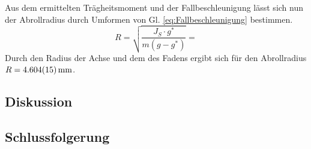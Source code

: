 			Aus dem ermittelten Trägheitsmoment und der Fallbeschleunigung lässt sich nun der Abrollradius durch Umformen von Gl. \ref{eq:Fallbeschleunigung} bestimmen.
			\begin{equation}
				R = \sqrt{\frac{J_S \cdot g^{*}}{m(g-g^{*})}} = %
			\end{equation}
			Durch den Radius der Achse und dem des Fadens ergibt sich für den Abrollradius $R = \SI{4,604+-0,015}{\mm}$.
			
	\subsection{Diskussion}
		
		
		
	\subsection{Schlussfolgerung}
	